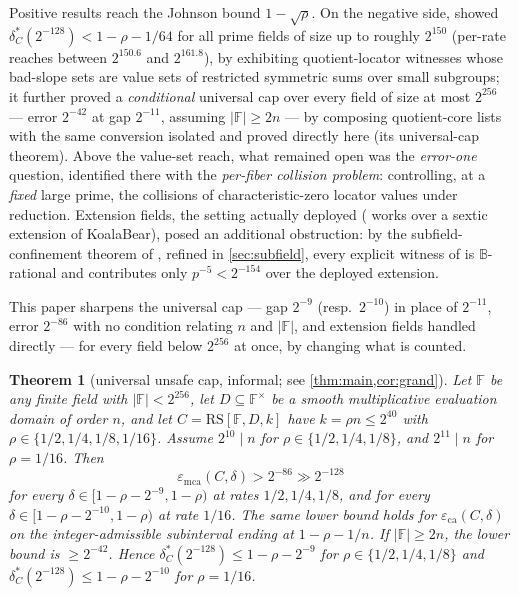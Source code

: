 \documentclass[11pt]{article}
\newtheorem{theorem}{Theorem}[section]
\theoremstyle{definition}
\theoremstyle{remark}
\newcommand{\F}{\mathbb{F}}
\newcommand{\B}{\mathbb{B}}
\newcommand{\RS}{\mathrm{RS}}
\newcommand{\eca}{\varepsilon_{\mathrm{ca}}}
\newcommand{\emca}{\varepsilon_{\mathrm{mca}}}
\begin{document}
Positive results reach the Johnson bound $1-\sqrt\rho$. On the negative side, \cite{Cho26b} showed $\delta^*_C(2^{-128})<1-\rho-1/64$ for all prime fields of size up to roughly $2^{150}$ (per-rate reaches between $2^{150.6}$ and $2^{161.8}$), by exhibiting quotient-locator witnesses whose bad-slope sets are value sets of restricted symmetric sums over small subgroups; it further proved a \emph{conditional} universal cap over every field of size at most $2^{256}$ --- error $2^{-42}$ at gap $2^{-11}$, assuming $|\F|\ge2n$ --- by composing quotient-core lists with the same conversion isolated and proved directly here (its universal-cap theorem). Above the value-set reach, what remained open was the \emph{error-one} question, identified there with the \emph{per-fiber collision problem}: controlling, at a \emph{fixed} large prime, the collisions of characteristic-zero locator values under reduction. Extension fields, the setting actually deployed (\cite[\S6.3]{ABF26} works over a sextic extension of KoalaBear), posed an additional obstruction: by the subfield-confinement theorem of \cite{Cho26b}, refined in \cref{sec:subfield}, every explicit witness of \cite{Cho26a,Cho26b} is $\B$-rational and contributes only $p^{-5}<2^{-154}$ over the deployed extension.

This paper sharpens the universal cap --- gap $2^{-9}$ (resp.\ $2^{-10}$) in place of $2^{-11}$, error $2^{-86}$ with no condition relating $n$ and $|\F|$, and extension fields handled directly --- for every field below $2^{256}$ at once, by changing what is counted.


\begin{theorem}[universal unsafe cap, informal; see \cref{thm:main,cor:grand}]\label{thm:informal}
Let $\F$ be any finite field with $|\F|<2^{256}$, let $D\subseteq\F^\times$ be a smooth multiplicative evaluation domain of order $n$, and let $C=\RS[\F,D,k]$ have $k=\rho n\le2^{40}$ with $\rho\in\{1/2,1/4,1/8,1/16\}$. Assume $2^{10}\mid n$ for $\rho\in\{1/2,1/4,1/8\}$, and $2^{11}\mid n$ for $\rho=1/16$. Then
\[
\emca(C,\delta)>2^{-86}\gg2^{-128}
\]
for every $\delta\in[1-\rho-2^{-9},1-\rho)$ at rates $1/2,1/4,1/8$, and for every $\delta\in[1-\rho-2^{-10},1-\rho)$ at rate $1/16$. The same lower bound holds for $\eca(C,\delta)$ on the integer-admissible subinterval ending at $1-\rho-1/n$. If $|\F|\ge2n$, the lower bound is $\ge2^{-42}$. Hence $\delta^*_C(2^{-128})\le1-\rho-2^{-9}$ for $\rho\in\{1/2,1/4,1/8\}$ and $\delta^*_C(2^{-128})\le1-\rho-2^{-10}$ for $\rho=1/16$.
\end{theorem}
\end{document}
